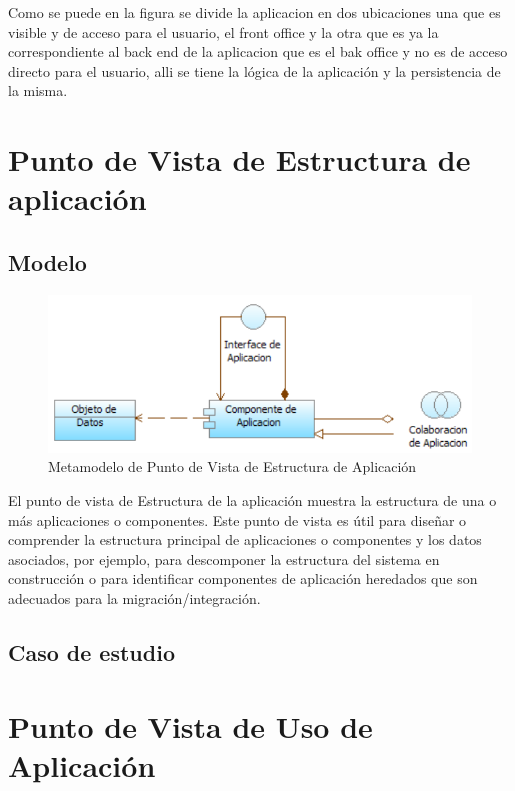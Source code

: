 Como se puede en la figura se divide la aplicacion en dos ubicaciones una que es visible y de acceso para el usuario, el front office y la otra que es ya la correspondiente al back end de la aplicacion que es el bak office y no es de acceso directo para el usuario, alli se tiene la lógica de la aplicación y la persistencia de la misma.
\newline



\newpage

\section{Punto de Vista de Estructura de aplicación}

\subsection{Modelo}

\begin{figure}[th!]
	\centering
	\includegraphics[width=0.7\linewidth]{arquitectura/imagenes/modeloEstructuraAplicacion}
	\caption{Metamodelo de Punto de Vista de Estructura de Aplicación \cite{pun9}}
	\label{fig:metamodelo de punto de vista de estructura de aplicación}
\end{figure}
El punto de vista de Estructura de la aplicación muestra la estructura de una o más aplicaciones o componentes. Este punto de vista es útil para diseñar o comprender la estructura principal de aplicaciones o componentes y los datos asociados, por ejemplo, para descomponer la estructura del sistema en construcción o para identificar componentes de aplicación heredados que son adecuados para la migración/integración.

\subsection{Caso de estudio}

\newpage

\section{Punto de Vista de Uso de Aplicación}

